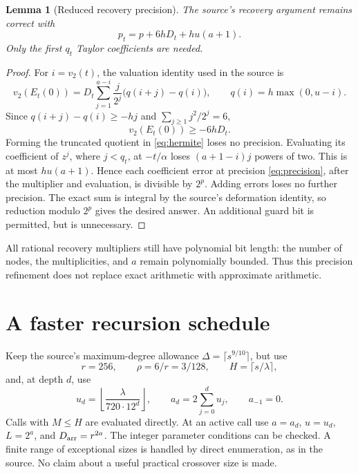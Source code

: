 \documentclass[11pt]{article}
\newtheorem{lemma}[theorem]{Lemma}
\theoremstyle{remark}
\newcommand{\vTwo}{v_2}
\begin{document}
\begin{lemma}[Reduced recovery precision]
\label{lem:precision}
The source's recovery argument remains correct with
\begin{equation}
 p_t=p+6hD_t+hu(a+1).\label{eq:precision}
\end{equation}
Only the first $q_t$ Taylor coefficients are needed.
\end{lemma}
\begin{proof}
For $i=\vTwo(t)$, the valuation identity used in the source is
\[
 \vTwo(E_t(0))=
 D_t\sum_{j=1}^{a-i}\frac{j}{2^j}
       \bigl(q(i+j)-q(i)\bigr),
 \qquad q(i)=h\max(0,u-i).
\]
Since $q(i+j)-q(i)\ge-hj$ and $\sum_{j\ge1}j^2/2^j=6$,
\begin{equation}
 \vTwo(E_t(0))\ge-6hD_t.\label{eq:hermite-loss}
\end{equation}
Forming the truncated quotient in \eqref{eq:hermite} loses no precision. Evaluating its coefficient of $z^j$, where $j<q_t$, at $-t/\alpha$ loses $(a+1-i)j$ powers of two. This is at most $hu(a+1)$. Hence each coefficient error at precision \eqref{eq:precision}, after the multiplier and evaluation, is divisible by $2^p$. Adding errors loses no further precision. The exact sum is integral by the source's deformation identity, so reduction modulo $2^p$ gives the desired answer. An additional guard bit is permitted, but is unnecessary.
\end{proof}

All rational recovery multipliers still have polynomial bit length: the number of nodes, the multiplicities, and $a$ remain polynomially bounded. Thus this precision refinement does not replace exact arithmetic with approximate arithmetic.

\section{A faster recursion schedule}
\label{sec:schedule}

Keep the source's maximum-degree allowance $\Delta=\lceil s^{9/10}\rceil$, but use
\begin{equation}
 r=256,\qquad \rho=6/r=3/128,\qquad
 H=\lceil s/\lambda\rceil,\label{eq:root-parameters}
\end{equation}
and, at depth $d$, use
\begin{equation}
 u_d=\left\lfloor\frac{\lambda}{720\cdot12^d}\right\rfloor,
 \qquad a_d=2\sum_{j=0}^d u_j,\qquad a_{-1}=0.
 \label{eq:schedule}
\end{equation}
Calls with $M\le H$ are evaluated directly. At an active call use $a=a_d$, $u=u_d$, $L=2^a$, and $D_{\rm arr}=r^{2a}$. The integer parameter conditions can be checked. A finite range of exceptional sizes is handled by direct enumeration, as in the source. No claim about a useful practical crossover size is made.
\end{document}

